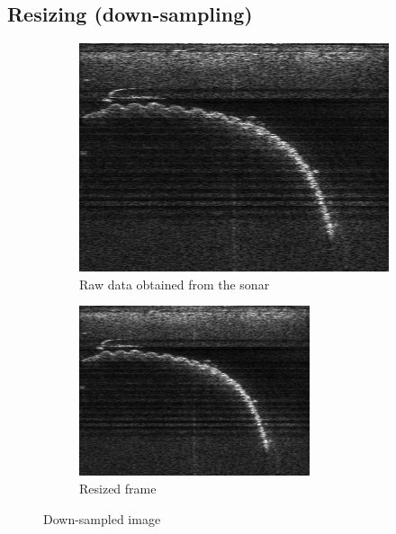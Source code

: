 \subsection{Resizing (down-sampling)}

\begin{figure}[H]
    \centering
    \begin{subfigure}[b]{.45\textwidth}
        \centering
        \includegraphics[width=\textwidth]{figures/pipeline/Original.png}
        \caption{Raw data obtained from the sonar}
    \end{subfigure}
    \hfill
    \begin{subfigure}[b]{.45\textwidth}
        \centering
        \includegraphics[width=\textwidth]{figures/pipeline/Resized.png}
        \caption{Resized frame}
    \end{subfigure}
    \caption{Down-sampled image}
    \label{fig:resizing}
\end{figure}

